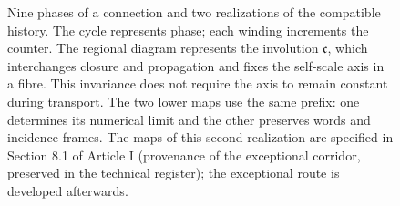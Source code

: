 \begin{figure}[!htbp]
\caption{\fontsize{9}{11}\selectfont Nine phases of a connection and two realizations of the compatible
history. The cycle represents phase; each winding increments the counter.
The regional diagram represents the involution \(\mathfrak c\), which
interchanges closure and propagation and fixes the self-scale axis in a fibre.
This invariance does not require the axis to remain constant during transport.
The two lower maps use the same prefix: one determines
its numerical limit and the other preserves words and incidence frames. The
maps of this second realization are specified in Section
8.1 of Article I (provenance of the exceptional corridor, preserved in the technical register); the exceptional route is developed afterwards.}
\label{mono-ampl:fig-regional}
\end{figure}

